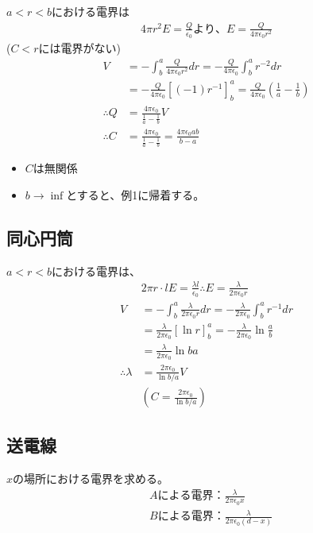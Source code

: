 \documentclass[12pt,fleqn]{ltjsarticle}
\begin{document}
$a<r<b$における電界は\\
\begin{align*}
4\pi r^2E=\frac {Q}{\epsilon_0}より、E=\frac{Q}{4\pi\epsilon_0r^2}
\end{align*}
($C<r$には電界がない)
\begin{align*}
V&=-\int^a_b \frac{Q}{4\pi\epsilon_0r^2}dr
=-\frac{Q}{4\pi\epsilon_0}\int^a_b r^{-2}dr\\
&=-\frac{Q}{4\pi\epsilon_0}[(-1)r^{-1}]^a_b
=\frac{Q}{4\pi\epsilon_0}(\frac 1a - \frac 1b)\\
\therefore Q&=\frac{4\pi\epsilon_0}{\frac 1a - \frac 1b}V\\
\therefore C&=\frac{4\pi\epsilon_0}{\frac 1a - \frac 1b}
=\frac{4\pi\epsilon_0ab}{b-a}
\end{align*}
\begin{itemize}
\item $C$は無関係
\item $b\rightarrow \inf$とすると、例1に帰着する。
\end{itemize}

\subsection{同心円筒}

$a<r<b$における電界は、
\begin{align*}
&2\pi r\cdot lE=\frac{\lambda l}{\epsilon_0}
\therefore E=\frac{\lambda}{2\pi\epsilon_0r}\\
V&=-\int^a_b\frac{\lambda}{2\pi\epsilon_0r}dr
=-\frac{\lambda}{2\pi\epsilon_0}\int^a_b r^{-1}dr\\
&=\frac{\lambda}{2\pi\epsilon_0}[\ln r]^a_b
=-\frac{\lambda}{2\pi\epsilon_0}\ln \frac ab\\
&=\frac{\lambda}{2\pi\epsilon_0}\ln ba\\
\therefore \lambda&=\frac{2\pi\epsilon_0}{\ln{b/a}}V\\
&\left(C=\frac{2\pi\epsilon_0}{\ln{b/a}}\right)
\end{align*}
\subsection{送電線}

$x$の場所における電界を求める。
\begin{align*}
&Aによる電界：\frac{\lambda}{2\pi\epsilon_0x}\\
&Bによる電界：\frac{\lambda}{2\pi\epsilon_0(d-x)}
\end{align*}
\end{document}
